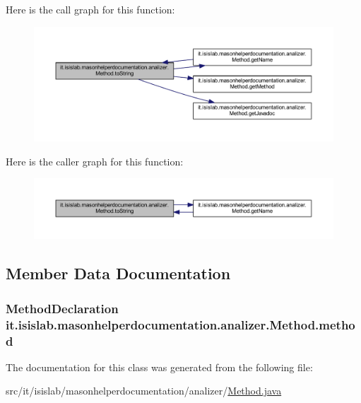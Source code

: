 Here is the call graph for this function\-:
\nopagebreak
\begin{figure}[H]
\begin{center}
\leavevmode
\includegraphics[width=350pt]{classit_1_1isislab_1_1masonhelperdocumentation_1_1analizer_1_1_method_abd783b39c400e8db1f5e0f08c00c8e5a_cgraph}
\end{center}
\end{figure}




Here is the caller graph for this function\-:
\nopagebreak
\begin{figure}[H]
\begin{center}
\leavevmode
\includegraphics[width=350pt]{classit_1_1isislab_1_1masonhelperdocumentation_1_1analizer_1_1_method_abd783b39c400e8db1f5e0f08c00c8e5a_icgraph}
\end{center}
\end{figure}




\subsection{Member Data Documentation}
\hypertarget{classit_1_1isislab_1_1masonhelperdocumentation_1_1analizer_1_1_method_a86b6aa02f4993d83ee78e19f1f211130}{
\subsubsection[{method}]{\setlength{\rightskip}{0pt plus 5cm}Method\-Declaration it.\-isislab.\-masonhelperdocumentation.\-analizer.\-Method.\-method\hspace{0.3cm}{\ttfamily [private]}}}\label{classit_1_1isislab_1_1masonhelperdocumentation_1_1analizer_1_1_method_a86b6aa02f4993d83ee78e19f1f211130}


The documentation for this class was generated from the following file\-:\begin{DoxyCompactItemize}
\item 
src/it/isislab/masonhelperdocumentation/analizer/\hyperlink{_method_8java}{Method.\-java}\end{DoxyCompactItemize}

